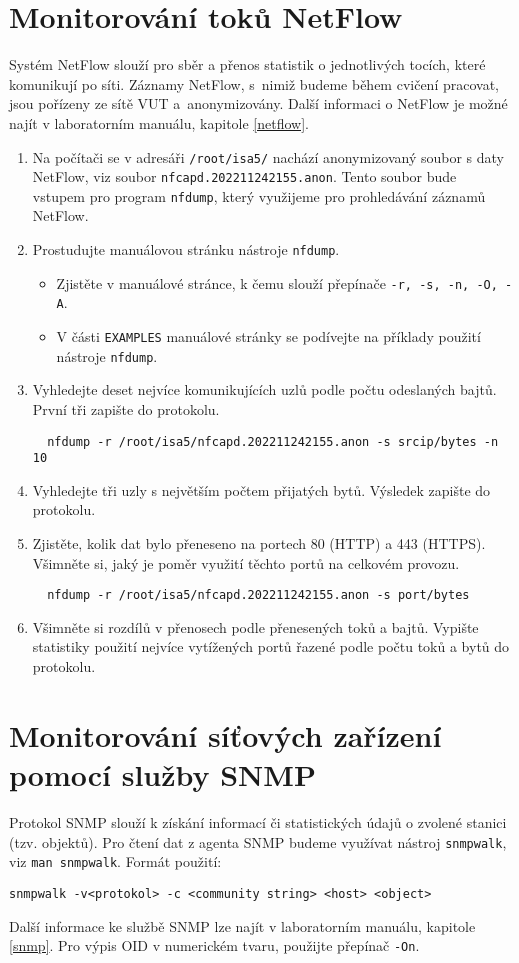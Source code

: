 \documentclass[a4paper,11pt]{article}
\begin{document}
\section{Monitorování toků NetFlow}
Systém NetFlow slouží pro sběr a přenos statistik o jednotlivých tocích, které komunikují po síti. Záznamy NetFlow, s~nimiž budeme během cvičení pracovat, jsou pořízeny ze sítě VUT a~anonymizovány. Další informaci o NetFlow je možné najít v laboratorním manuálu, kapitole \ref{netflow}.
\begin{enumerate}
  \item Na počítači se v adresáři {\tt /root/isa5/} nachází anonymizovaný soubor s daty NetFlow, viz soubor \texttt{nfcapd.202211242155.anon}. Tento soubor bude vstupem pro program  {\tt nfdump}, který využijeme pro prohledávání záznamů NetFlow.
  \item Prostudujte manuálovou stránku nástroje {\tt nfdump}.
    \begin{itemize}
      \item Zjistěte v manuálové stránce, k čemu slouží přepínače {\tt -r, -s, -n, -O, -A}.
      \item V části {\tt EXAMPLES} manuálové stránky se podívejte na příklady použití nástroje {\tt nfdump}.
    \end{itemize}
  \item Vyhledejte deset nejvíce komunikujících uzlů podle počtu odeslaných bajtů. První tři zapište do protokolu. 
\begin{verbatim}
  nfdump -r /root/isa5/nfcapd.202211242155.anon -s srcip/bytes -n 10
\end{verbatim}
  \item Vyhledejte tři uzly s největším počtem přijatých bytů. Výsledek zapište do protokolu.
  \item Zjistěte, kolik dat bylo přeneseno na portech 80 (HTTP) a 443 (HTTPS). Všimněte si, jaký je poměr využití těchto portů na celkovém provozu.
\begin{verbatim}
  nfdump -r /root/isa5/nfcapd.202211242155.anon -s port/bytes 
\end{verbatim}
  \item Všimněte si rozdílů v přenosech podle přenesených toků a bajtů. Vypište statistiky použití nejvíce vytížených portů řazené podle počtu toků a bytů do protokolu.
\end{enumerate}

\section{Monitorování síťových zařízení pomocí služby SNMP}
Protokol SNMP slouží k získání informací či statistických údajů o zvolené stanici (tzv. objektů). Pro čtení dat z agenta SNMP budeme využívat nástroj \texttt{snmpwalk}, viz \texttt{man snmpwalk}. Formát použití:
\begin{verbatim}
snmpwalk -v<protokol> -c <community string> <host> <object>
\end{verbatim}
Další informace ke službě SNMP lze najít v laboratorním manuálu, kapitole \ref{snmp}. Pro výpis OID v numerickém tvaru, použijte přepínač \verb|-On|. 
\end{document}
